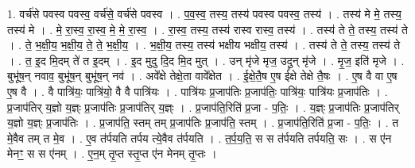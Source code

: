 \documentclass[17pt]{extarticle}
\begin{document}
1. वर्च॑से पवस्व पवस्व॒ वर्च॑से॒ वर्च॑से पवस्व । . प॒व॒स्व॒ तस्य॒ तस्य॑ पवस्व पवस्व॒ तस्य॑ । . तस्य॑ मे मे॒ तस्य॒ तस्य॑ मे । . मे॒ रा॒स्व॒ रा॒स्व॒ मे॒ मे॒ रा॒स्व॒ । . रा॒स्व॒ तस्य॒ तस्य॑ रास्व रास्व॒ तस्य॑ । . तस्य॑ ते ते॒ तस्य॒ तस्य॑ ते । . ते॒ भ॒क्षी॒य॒ भ॒क्षी॒य॒ ते॒ ते॒ भ॒क्षी॒य॒ । . भ॒क्षी॒य॒ तस्य॒ तस्य॑ भक्षीय भक्षीय॒ तस्य॑ । . तस्य॑ ते ते॒ तस्य॒ तस्य॑ ते । . त॒ इ॒द मि॒दम् ते॑ त इ॒दम् । . इ॒द मुदु दि॒द मि॒द मुत् । . उन् मृ॑जे मृज॒ उदुन् मृ॑जे । . मृ॒ज॒ इति॑ मृजे । . बुभू॑ष॒न् नवाव॒ बुभू॑ष॒न् बुभू॑ष॒न् नव॑ । . अवे᳚क्षे तेक्षे॒ता वावे᳚क्षेत । . ई॒क्षे॒तै॒ष ए॒ष ई᳚क्षे तेक्षे तै॒षः । . ए॒ष वै वा ए॒ष ए॒ष वै । . वै पात्रि॑यः॒ पात्रि॑यो॒ वै वै पात्रि॑यः । . पात्रि॑यः प्र॒जाप॑तिः प्र॒जाप॑तिः॒ पात्रि॑यः॒ पात्रि॑यः प्र॒जाप॑तिः । . प्र॒जाप॑तिर् य॒ज्ञो य॒ज्ञ्ः प्र॒जाप॑तिः प्र॒जाप॑तिर् य॒ज्ञ्ः । . प्र॒जाप॑ति॒रिति॑ प्र॒जा - प॒तिः॒ । . य॒ज्ञ्ः प्र॒जाप॑तिः प्र॒जाप॑तिर् य॒ज्ञो य॒ज्ञ्ः प्र॒जाप॑तिः । . प्र॒जाप॑ति॒ स्तम् तम् प्र॒जाप॑तिः प्र॒जाप॑ति॒ स्तम् । . प्र॒जाप॑ति॒रिति॑ प्र॒जा - प॒तिः॒ । . त मे॒वैव तम् त मे॒व । . ए॒व त॑र्पयति तर्पय त्ये॒वैव त॑र्पयति । . त॒र्प॒य॒ति॒ स स त॑र्पयति तर्पयति॒ सः । . स ए॑न मेनꣳ॒॒ स स ए॑नम् । . ए॒न॒म् तृ॒प्त स्तृ॒प्त ए॑न मेनम् तृ॒प्तः । \newline
\end{document}
